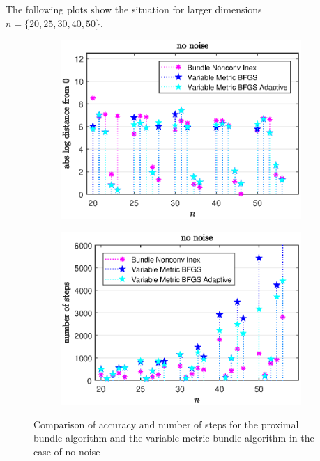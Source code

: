 The following plots show the situation for larger dimensions \(n = \{20,25,30,40,50\}\).


\begin{figure}[H]%
	\begin{subfigure}{0.49\textwidth}
		\includegraphics[width=\textwidth]{Pictures/Plots/no_noise_b.eps}%
	\end{subfigure}
	\begin{subfigure}{0.49\textwidth}
		\includegraphics[width=\textwidth]{Pictures/Plots/steps_no_noise_b.eps}%
	\end{subfigure}
	\caption[Accuracy and number of steps: no noise, higher dimensions]{Comparison of accuracy and number of steps for the proximal bundle algorithm and the variable metric bundle algorithm in the case of no noise}
	\label{fig_no_noise_large}

\end{figure}

